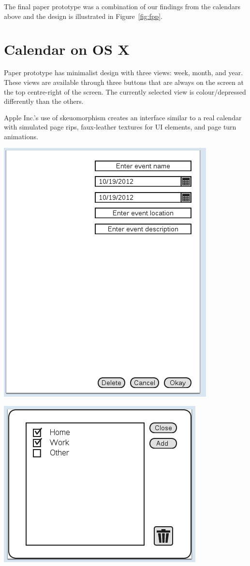\documentclass{article}
\begin{document}
The final paper prototype was a combination of our findings from the
calendars above and the design is illustrated in Figure~\ref{fig:fpp}.

\section{Calendar on OS X}

Paper prototype has minimalist design with three views: week, month,
and year. These views are available through three buttons that are
always on the screen at the top centre-right of the screen. The
currently selected view is colour/depressed differently than the
others.

Apple Inc.'s use of skeuomorphism creates an interface similar to a real 
calendar with simulated page rips, faux-leather textures for UI
elements, and page turn animations.

\includegraphics[scale=0.5]{CMCLGDREvent.png}

\includegraphics[scale=0.5]{CMCLGDRViewCalendar.png}
\end{document}
